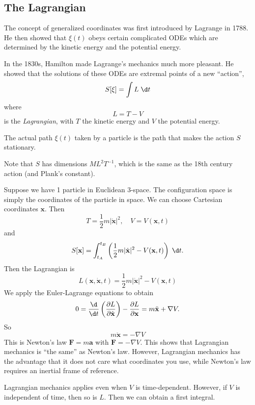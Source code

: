 \documentclass[a4paper]{article}
\begin{document}
\subsection{The Lagrangian}
The concept of generalized coordinates was first introduced by Lagrange in 1788. He then showed that $\xi(t)$ obeys certain complicated ODEs which are determined by the kinetic energy and the potential energy.

In the 1830s, Hamilton made Lagrange's mechanics much more pleasant. He showed that the solutions of these ODEs are extremal points of a new ``action'',
\[
  S[\xi] = \int L\;\d t
\]
where
\[
  L = T - V
\]
is the \emph{Lagrangian}, with $T$ the kinetic energy and $V$ the potential energy.

\begin{law}
  The actual path $\xi(t)$ taken by a particle is the path that makes the action $S$ stationary.
\end{law}

Note that $S$ has dimensions $ML^2T^{-1}$, which is the same as the 18th century action (and Plank's constant).

\begin{eg}
  Suppose we have 1 particle in Euclidean 3-space. The configuration space is simply the coordinates of the particle in space. We can choose Cartesian coordinates $\mathbf{x}$. Then
  \[
    T = \frac{1}{2}m|\dot{\mathbf{x}}|^2,\quad V = V(\mathbf{x}, t)
  \]
  and
  \[
    S[\mathbf{x}] = \int_{t_A}^{t_B}\left(\frac{1}{2}m|\dot{\mathbf{x}}|^2 - V(\mathbf{x}, t)\right)\;\d t.
  \]
  Then the Lagrangian is
  \[
    L(\mathbf{x}, \dot{\mathbf{x}}, t) = \frac{1}{2}m|\dot{\mathbf{x}}|^2 - V(\mathbf{x}, t)
  \]
  We apply the Euler-Lagrange equations to obtain
  \[
    0 = \frac{\d}{\d t}\left(\frac{\partial L}{\partial \dot{\mathbf{x}}}\right) - \frac{\partial L}{\partial \mathbf{x}} = m\ddot{\mathbf{x}} + \nabla V.
  \]
  So
  \[
    m\ddot{\mathbf{x}} = -\nabla V
  \]
  This is Newton's law $\mathbf{F} = m\mathbf{a}$ with $\mathbf{F} = -\nabla V$. This shows that Lagrangian mechanics is ``the same'' as Newton's law. However, Lagrangian mechanics has the advantage that it does not care what coordinates you use, while Newton's law requires an inertial frame of reference.
\end{eg}
Lagrangian mechanics applies even when $V$ is time-dependent. However, if $V$ is independent of time, then so is $L$. Then we can obtain a first integral.
\end{document}
